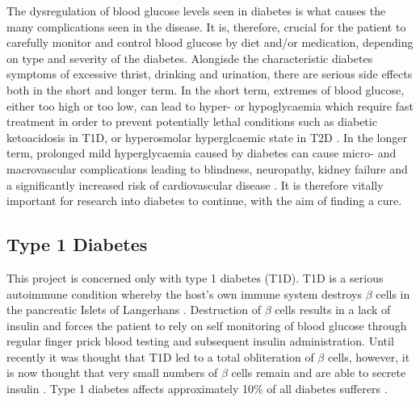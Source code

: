 The dysregulation of blood glucose levels seen in diabetes is what causes the many complications seen in the disease.
It is, therefore, crucial for the patient to carefully monitor and control blood glucose by diet and/or medication, depending on type and severity of the diabetes.
Alongisde the characteristic diabetes symptoms of excessive thrist, drinking and urination, there are serious side effects both in the short and longer term.
In the short term, extremes of blood glucose, either too high or too low, can lead to hyper- or hypoglycaemia which require fast treatment in order to prevent potentially lethal conditions such as diabetic ketoacidosis in T1D, or hyperosmolar hyperglcaemic state in T2D \citep{OxClinMed, DiabetesUK}.
In the longer term, prolonged mild hyperglycaemia caused by diabetes can cause micro- and macrovascular complications leading to blindness, neuropathy, kidney failure and a significantly increased risk of cardiovascular disease \citep{OxClinMed}.
It is therefore vitally important for research into diabetes to continue, with the aim of finding a cure.

\subsection{Type 1 Diabetes}

This project is concerned only with type 1 diabetes (T1D).
T1D is a serious autoimmune condition whereby the host's own immune system destroys $\beta$ cells in the pancreatic Islets of Langerhans \citep{Daneman2006}.
Destruction of $\beta$ cells results in a lack of insulin and forces the patient to rely on self monitoring of blood glucose through regular finger prick blood testing and subsequent insulin administration.
Until recently it was thought that T1D led to a total obliteration of $\beta$ cells, however, it is now thought that very small numbers of $\beta$ cells remain and are able to secrete insulin \citep{Oram2014, Veld2014}.
Type 1 diabetes affects approximately 10\% of all diabetes sufferers \citep{DiabetesUK}.






